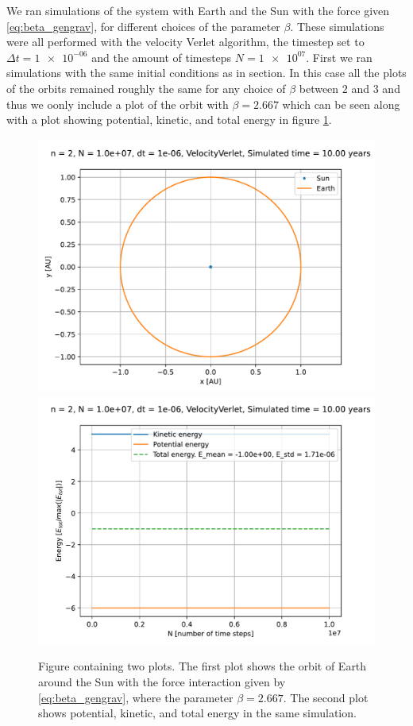 \documentclass[reprint,english,notitlepage]{revtex4-1}  %
\begin{document}
We ran simulations of the system with Earth and the Sun with the force given \eqref{eq:beta_gengrav}, for different choices of the parameter $\beta$. These simulations were all performed with the velocity Verlet algorithm, the timestep set to $\Delta t = \num{1e-06}$ and the amount of timesteps $N = \num{1e+07}$. First we ran simulations with the same initial conditions as in section. In this case all the plots of the orbits remained roughly the same for any choice of $\beta$ between $2$ and $3$ and thus we oonly include a plot of the orbit with $\beta=2.667$ which can be seen along with a plot showing potential, kinetic, and total energy in figure \ref{fig:beta-se-orbit-energy}.


\begin{figure}[H]
\includegraphics[scale=0.5]{../data/figures/varyingbeta/se_beta2667_vv_orbits2D.pdf}
\includegraphics[scale=0.5]{../data/figures/varyingbeta/se_beta2667_vv_energy.pdf}
\caption{Figure containing two plots. The first plot shows the orbit of Earth around the Sun with the force interaction given by \eqref{eq:beta_gengrav}, where the parameter $\beta = 2.667$. The second plot shows potential, kinetic, and total energy in the same simulation.} 
\label{fig:beta-se-orbit-energy}
\end{figure}
\end{document}
